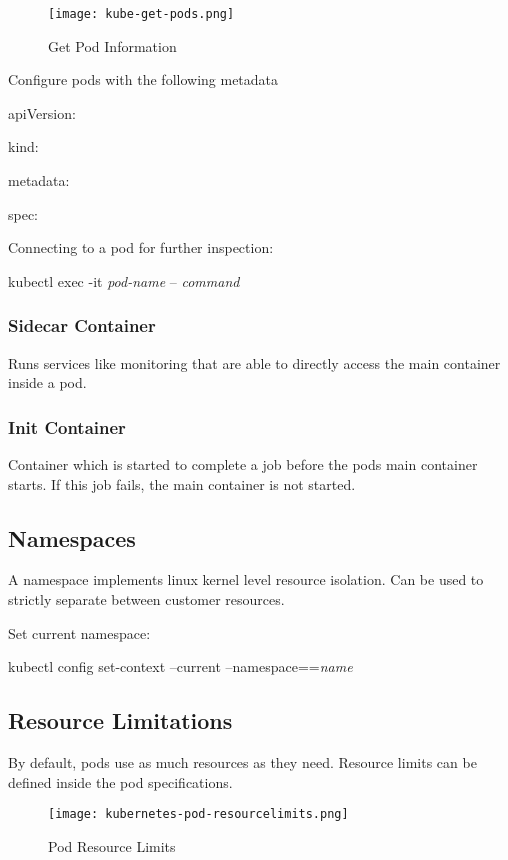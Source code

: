 \begin{figure}[h]
    \centering
    \texttt{[image: kube-get-pods.png]}
    \caption{Get Pod Information}
\end{figure}

\noindent
Configure pods with the following metadata

\ttfamily
apiVersion:

kind:

metadata:

spec:
\rmfamily

\vspace{3mm}
\noindent
Connecting to a pod for further inspection:

\ttfamily
    kubectl exec -it \emph{pod-name} -- \emph{command}
\rmfamily

\subsubsection{Sidecar Container}
Runs services like monitoring that are able to directly access the main container inside a pod.

\subsubsection{Init Container}
Container which is started to complete a job before the pods main container starts. 
If this job fails, the main container is not started. 


\subsection{Namespaces}
A namespace implements linux kernel level resource isolation. Can be used to strictly separate between customer resources.

Set current namespace: 

\noindent
\ttfamily kubectl config set-context --current --namespace==\emph{name}\rmfamily

\subsection{Resource Limitations}
By default, pods use as much resources as they need. Resource limits can be defined inside the pod specifications.

\begin{figure}[h]
    \centering
    \texttt{[image: kubernetes-pod-resourcelimits.png]}
    \caption{Pod Resource Limits}
\end{figure}

